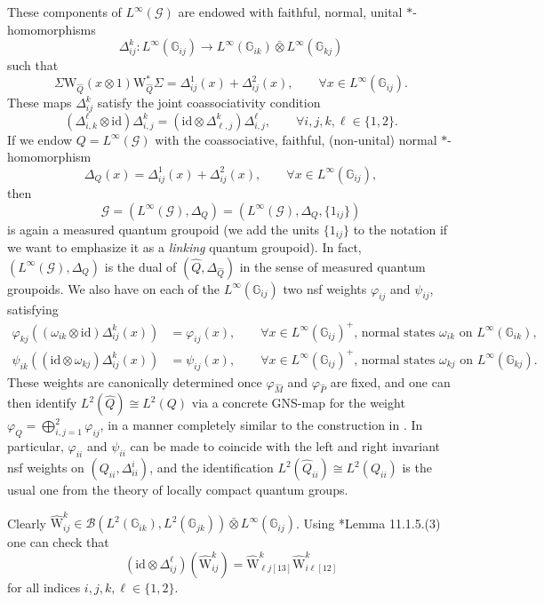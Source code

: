 \documentclass[reqno]{amsart}
\numberwithin{equation}{section}
\newcommand{\mcB}{\mathcal{B}}
\newcommand{\id}{\mathrm{id}}
\newcommand{\G}{\mathbb{G}}
\newcommand{\msG}{\mathscr{G}}
\newcommand{\vp}{\varphi}
\newcommand{\ww}{\mathrm{W}}
\begin{document}
These components of $L^{\infty}(\msG)$ are endowed with faithful, normal, unital $*$-homomorphisms 
\[
\Delta_{ij}^k\colon L^{\infty}(\G_{ij}) \rightarrow L^{\infty}(\G_{ik})\bar{\otimes} L^{\infty}(\G_{kj})
\]
such that
\[
\Sigma \ww_{\hat{Q}}(x\otimes 1)\ww_{\hat{Q}}^*\Sigma = \Delta_{ij}^1(x) + \Delta_{ij}^2(x),\qquad \forall x\in L^{\infty}(\G_{ij}).  
\]
These maps $\Delta_{ij}^k$ satisfy the joint coassociativity condition
\[
(\Delta_{i,k}^{\ell}\otimes \id)\Delta_{i,j}^k=
(\id \otimes \Delta^k_{\ell,j})\Delta_{i,j}^{\ell},\qquad \forall i,j,k,\ell \in \{1,2\}.
\]
If we endow $Q = L^{\infty}(\msG)$ with the coassociative, faithful, (non-unital) normal $*$-homomorphism
\[
\Delta_{Q}(x) = \Delta_{ij}^1(x) + \Delta_{ij}^2(x),\qquad \forall x\in L^{\infty}(\G_{ij}),
\]
then 
\begin{equation}\label{EqDefLQGr}
\msG = (L^{\infty}(\msG),\Delta_Q) = (L^{\infty}(\msG),\Delta_Q,\{1_{ij}\})
\end{equation} 
is again a measured quantum groupoid (we add the units $\{1_{ij}\}$ to the notation if we want to emphasize it as a \emph{linking} quantum groupoid). In fact, $(L^{\infty}(\msG),\Delta_Q)$ is the dual of $(\hat{Q},\Delta_{\hat{Q}})$ in the sense of measured quantum groupoids. We also have on each of the $L^{\infty}(\G_{ij})$ two nsf weights $\vp_{ij}$ and $\psi_{ij}$, satisfying 
\[\begin{split}
\vp_{kj}((\omega_{ik}\otimes \id)\Delta_{ij}^k(x)) &= \vp_{ij}(x),\qquad \forall x\in L^{\infty}(\G_{ij})^+,\, \textrm{normal states }\omega_{ik}\textrm{ on }L^{\infty}(\G_{ik}),\\
 \psi_{ik}((\id\otimes \omega_{kj})\Delta_{ij}^k(x)) &= \psi_{ij}(x),\qquad \forall x\in L^{\infty}(\G_{ij})^+,\, \textrm{normal states }\omega_{kj}\textrm{ on }L^{\infty}(\G_{kj}).
\end{split}\]
These weights are canonically determined once $\vp_{\hat{M}}$ and $\vp_{\hat{P}}$ are fixed, and one can then identify $L^2(\hat{Q})\cong L^2(Q)$ via a concrete GNS-map for the weight $\vp_Q = \bigoplus_{i,j=1}^{2}\vp_{ij}$, in a manner completely similar to the construction in \cite{KV03}. In particular, $\vp_{ii}$ and $\psi_{ii}$ can be made to coincide with the left and right invariant nsf weights on $(Q_{ii},\Delta_{ii}^i)$, and the identification $L^2(\hat{Q}_{ii})\cong L^2(Q_{ii})$ is the usual one from the theory of locally compact quantum groups.  

Clearly $\hat{\ww}^{k}_{ij}\in \mcB(L^2(\G_{ik}),L^2(\G_{jk}))\bar\otimes L^{\infty}(\G_{ij})$.  Using \cite{DC09}*{Lemma 11.1.5.(3)} one can check that
\begin{equation}\label{eq17}
(\id\otimes \Delta^{\ell}_{ij})(\hat{\ww}^{k}_{ij})=
\hat{\ww}^{k}_{\ell j [13]} \hat{\ww}^{k}_{i\ell [12]}
\end{equation}
for all indices $i,j,k,\ell \in \{1,2\}$.
\end{document}
